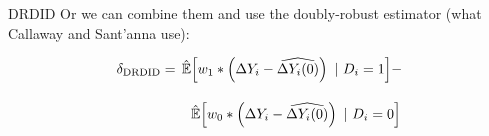 \documentclass[t]{beamer}
\begin{document}
\begin{frame}{DRDID}
  Or we can combine them and use the doubly-robust estimator (what Callaway and Sant'anna use):

  \begin{align*}
    \delta_{\text{DRDID}} &=
      \expechat{w_1 * \left(\Delta Y_i - \widehat{\Delta Y_i(0)} \right)}{D_i = 1} - \\[1em]
    &\quad\quad
      \expechat{w_0 * \left(\Delta Y_i - \widehat{\Delta Y_i(0)} \right)}{D_i = 0}
  \end{align*}
\end{frame}
\end{document}
